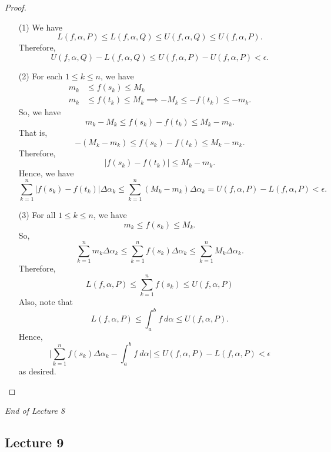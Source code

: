 \begin{proof}
\begin{enumerate}
    \item[(1)] We have 
        \[  L(f,\alpha, P) \leq L(f,\alpha, Q ) \leq U(f,\alpha, Q) \leq U(f,\alpha, P). \]
        Therefore, 
        \[  U(f,\alpha, Q ) - L(f,\alpha,Q) \leq U(f,\alpha, P) - U(f,\alpha, P) < \epsilon. \]
    \item[(2)] For each \( 1 \leq k \leq n  \), we have 
        \begin{align*}
            {m}_{k } &\leq f({s}_{k}) \leq {M}_{k} \\
            {m}_{k}&\leq f({t}_{k}) \leq {M}_{k} \implies - {M}_{k } \leq - f({t}_{k}) \leq - {m}_{k}.
        \end{align*}
        So, we have 
        \[  {m}_{k } - {M}_{k } \leq f({s}_{k}) - f({t}_{k}) \leq {M}_{k } - {m}_{k}. \]
        That is, 
        \[  - ({M}_{k } - {m}_{k}) \leq f({s}_{k}) - f({t}_{k}) \leq {M}_{k } - {m}_{k}. \]
        Therefore, 
        \[  | f({s}_{k}) - f({t}_{k})  | \leq {M}_{k } - {m}_{k}. \]
        Hence, we have 
        \[ \sum_{ k=1  }^{ n } | f({s}_{k}) - f({t}_{k}) |  \Delta {\alpha}_{k } \leq \sum_{ k=1  }^{ n } ({M}_{k } - {m}_{k}) \Delta {\alpha}_{k } = U(f,\alpha, P) - L(f,\alpha,P) < \epsilon. \]
    \item[(3)] For all \( 1 \leq k \leq n  \), we have 
        \[  {m}_{k } \leq f({s}_{k}) \leq {M}_{k }. \]
        So, 
        \[  \sum_{ k=1  }^{ n } {m}_{k } \Delta {\alpha}_{k } \leq \sum_{ k=1  }^{ n } f({s}_{k}) \Delta {\alpha}_{k } \leq \sum_{ k=1  }^{ n } {M}_{k } \Delta {\alpha}_{k }. \]
        Therefore, 
        \[  L(f,\alpha, P) \leq \sum_{ k=1  }^{ n } f({s}_{k}) \leq U(f,\alpha,P) \tag{I} \]
        Also, note that 
        \[  L(f,\alpha,P) \leq \int_{ a }^{ b }  f  \ d \alpha \leq U(f,\alpha, P). \tag{II} \]
        Hence,
        \[  \Big| \sum_{ k=1  }^{ n } f({s}_{k}) \Delta {\alpha}_{k } - \int_{ a }^{ b }  f \ d \alpha \Big|  \leq U(f,\alpha, P) - L(f,\alpha, P) < \epsilon \]
        as desired.
\end{enumerate}
\end{proof}



\begin{center}
    \textit{End of Lecture 8} 
\end{center}





\subsection{Lecture 9}

